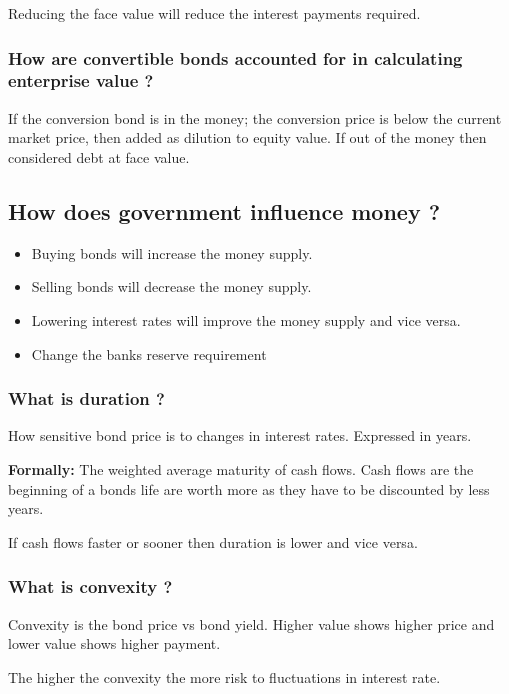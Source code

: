\documentclass[11pt]{scrartcl} %
\begin{document}
Reducing the face value will reduce the interest payments required.

\subsubsection{How are convertible bonds accounted for in calculating enterprise value ?}

If the conversion bond is in the money; the conversion price is below the current market price, then added as dilution to equity value. If out of the money then considered debt at face value.

\subsection{How does government influence money ?}

\begin{itemize}
	\item Buying bonds will increase the money supply.
	\item Selling bonds will decrease the money supply.
	\item Lowering interest rates will improve the money supply and vice versa.
	\item Change the banks reserve requirement
\end{itemize}

\subsubsection{What is duration ?}

How sensitive bond price is to changes in interest rates. Expressed in years.

\textbf{Formally:} The weighted average maturity of cash flows. Cash flows are the beginning of a bonds life are worth more as they have to be discounted by less years.

If cash flows faster or sooner then duration is lower and vice versa.

\subsubsection{What is convexity ?}

Convexity is the bond price vs bond yield. Higher value shows higher price and lower value shows higher payment.

The higher the convexity the more risk to fluctuations in interest rate. 
\end{document}

